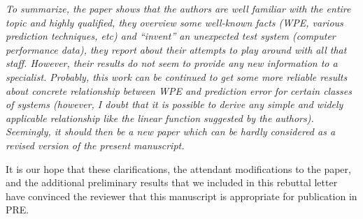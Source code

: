 \documentclass[12pt]{article}
\begin{document}
\emph{To summarize, the paper shows that the authors are well familiar
  with the entire topic and highly qualified, they overview some
  well-known facts (WPE, various prediction techniques, etc) and
  ``invent'' an unexpected test system (computer performance data),
  they report about their attempts to play around with all that
  staff. However, their results do not seem to provide any new
  information to a specialist. Probably, this work can be continued to
  get some more reliable results about concrete relationship between
  WPE and prediction error for certain classes of systems (however, I
  doubt that it is possible to derive any simple and widely applicable
  relationship like the linear function suggested by the
  authors). Seemingly, it should then be a new paper which can be
  hardly considered as a revised version of the present manuscript.}

It is our hope that these clarifications, the attendant modifications
to the paper, and the additional preliminary results that we included
in this rebuttal letter have convinced the reviewer that this
manuscript is appropriate for publication in PRE.
\end{document}
